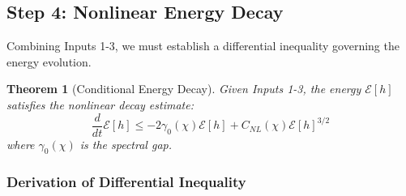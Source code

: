 \documentclass[12pt,a4paper]{article}
\newtheorem{theorem}{Theorem}[section]
\begin{document}
\subsection{Step 4: Nonlinear Energy Decay}

Combining Inputs 1-3, we must establish a differential inequality governing the energy evolution.

\begin{theorem}[Conditional Energy Decay]\label{thm:roadmap-decay}
Given Inputs 1-3, the energy $\mathcal{E}[h]$ satisfies the nonlinear decay estimate:
\begin{equation}
\frac{d}{dt}\mathcal{E}[h] \leq -2\gamma_0(\chi)\mathcal{E}[h] + C_{NL}(\chi)\mathcal{E}[h]^{3/2}
\end{equation}
where $\gamma_0(\chi)$ is the spectral gap.
\end{theorem}

\subsubsection{Derivation of Differential Inequality}
\end{document}
